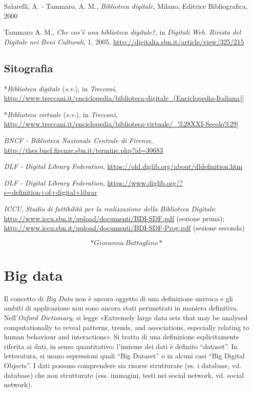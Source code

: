 \documentclass[
  b5paper,
  twoside,
  12pt,
  chapterprefix=false,
  bibliography=totocnumbered,
  parskip=false]{scrbook}
\begin{document}
Salarelli, A. - Tammaro, A. M., \emph{Biblioteca digitale}, Milano, Editrice
Bibliografica, 2000

Tammaro A. M., \emph{Che cos'è una biblioteca digitale?}, in \emph{Digitali Web.
Rivista del Digitale nei Beni Culturali}, 1, 2005,
\url{http://digitalia.sbn.it/article/view/325/215}

\hypertarget{sitografia-2}{%
\section*{Sitografia}\label{sitografia-2}}

*\emph{Biblioteca digitale} (\emph{s.v.}), in \emph{Treccani},
\url{http://www.treccani.it/enciclopedia/biblioteca-digitale_(Enciclopedia-Italiana)}{]}

*\emph{Biblioteca virtuale} (\emph{s.v.}), in \emph{Treccani},
\url{http://www.treccani.it/enciclopedia/biblioteca-virtuale/_\%28XXI-Secolo\%29}{]}

\emph{BNCF - Biblioteca Nazionale Centrale di Firenze},
\url{http://thes.bncf.firenze.sbn.it/termine.php?id=30683}

\emph{DLF - Digital Library Federation},
\url{https://old.diglib.org/about/dldefinition.htm}

\emph{DLF - Digital Library Federation},
\url{https://www.diglib.org/?s=definition+of+digital+librar}

\emph{ICCU}, \emph{Studio di fattibilità per la realizzazione della Biblioteca
Digitale}:
\url{http://www.iccu.sbn.it/upload/documenti/BDI-SDF.pdf}
(sezione prima);
\url{http://www.iccu.sbn.it/upload/documenti/BDI-SDF-Prog.pdf}
(sezione seconda)

\[*Giovanna~Battaglino*\]

\hypertarget{big-data}{%
\chapter{Big data}\label{big-data}}

Il concetto di \emph{Big Data} non è ancora oggetto di una definizione
univoca e gli ambiti di applicazione non sono ancora stati perimetrati
in maniera definitiva. Nell'\emph{Oxford Dictionary}, si legge «Extremely large
data sets that may be analysed computationally to reveal patterns,
trends, and associations, especially relating to human behaviour and
interactions». Si tratta di una definizione esplicitamente riferita ai
dati, in senso quantitativo; l'insieme dei dati è definito \enquote{dataset}. In
letteratura, si usano espressioni quali \enquote{Big Dataset} o in alcuni casi
\enquote{Big Digital Objects}. I dati possono comprendere sia risorse
strutturate (es. i database, vd. database) che non strutturate (ess.
immagini, testi nei social network, vd. social network).
\end{document}
